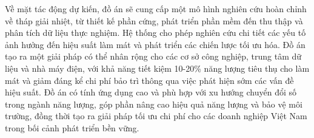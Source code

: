 \documentclass[../main.tex]{subfiles}
\begin{document}
Về mặt tác động dự kiến, đồ án sẽ cung cấp một mô hình nghiên cứu hoàn chỉnh về tháp giải nhiệt, từ thiết kế phần cứng, phát triển phần mềm đến thu thập và phân tích dữ liệu thực nghiệm. Hệ thống cho phép nghiên cứu chi tiết các yếu tố ảnh hưởng đến hiệu suất làm mát và phát triển các chiến lược tối ưu hóa. Đồ án tạo ra một giải pháp có thể nhân rộng cho các cơ sở công nghiệp, trung tâm dữ liệu và nhà máy điện, với khả năng tiết kiệm 10-20\% năng lượng tiêu thụ cho làm mát và giảm đáng kể chi phí bảo trì thông qua việc phát hiện sớm các vấn đề hiệu suất. Đồ án có tính ứng dụng cao và phù hợp với xu hướng chuyển đổi số trong ngành năng lượng, góp phần nâng cao hiệu quả năng lượng và bảo vệ môi trường, đồng thời tạo ra giải pháp tối ưu chi phí cho các doanh nghiệp Việt Nam trong bối cảnh phát triển bền vững.
\end{document}

